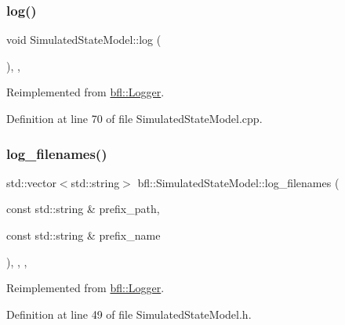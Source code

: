 \subsubsection{\texorpdfstring{log()}{log()}}
{\footnotesize\ttfamily void Simulated\+State\+Model\+::log (\begin{DoxyParamCaption}{ }\end{DoxyParamCaption})\hspace{0.3cm}{\ttfamily [override]}, {\ttfamily [protected]}, {\ttfamily [virtual]}}



Reimplemented from \mbox{\hyperlink{classbfl_1_1Logger_ad44f46593cb8c4c87c1178eb326e2f64}{bfl\+::\+Logger}}.



Definition at line 70 of file Simulated\+State\+Model.\+cpp.

\mbox{\label{classbfl_1_1SimulatedStateModel_ab4212871b8ca425855ec351c13dc3052}} 
\subsubsection{\texorpdfstring{log\+\_\+filenames()}{log\_filenames()}}
{\footnotesize\ttfamily std\+::vector$<$std\+::string$>$ bfl\+::\+Simulated\+State\+Model\+::log\+\_\+filenames (\begin{DoxyParamCaption}\item[{const std\+::string \&}]{prefix\+\_\+path,  }\item[{const std\+::string \&}]{prefix\+\_\+name }\end{DoxyParamCaption})\hspace{0.3cm}{\ttfamily [inline]}, {\ttfamily [override]}, {\ttfamily [protected]}, {\ttfamily [virtual]}}



Reimplemented from \mbox{\hyperlink{classbfl_1_1Logger_a328ceaa8e70e6918f11142b12b8be217}{bfl\+::\+Logger}}.



Definition at line 49 of file Simulated\+State\+Model.\+h.

\mbox{\label{classbfl_1_1Logger_a1033ff31398484f2132f84fd140da9e3}} 
